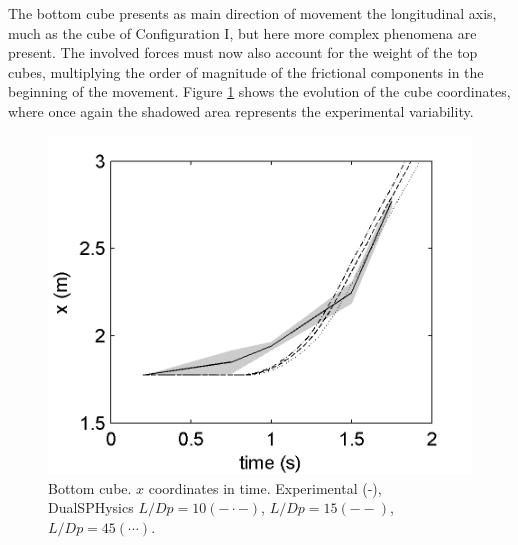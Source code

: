 The bottom cube presents as main direction of movement the longitudinal axis, much as the cube of Configuration I, but here more complex phenomena are present. The involved forces must now also account for the weight of the top cubes, multiplying the order of magnitude of the frictional components in the beginning of the movement. Figure \ref{fig:cube1} shows the evolution of the cube coordinates, where once again the shadowed area represents the experimental variability.
%
\begin{figure}[ht!]
	\centering
	\includegraphics[width=0.45\linewidth]{Figures/5.Chapter/Fig_5}
	\caption{Bottom cube. $x$ coordinates in time. Experimental (-), DualSPHysics $L/Dp=10 (- \cdot -)$, $L/Dp=15 (- -)$, $L/Dp=45 (\cdots)$.}
	\label{fig:cube1} 
\end{figure}
%

